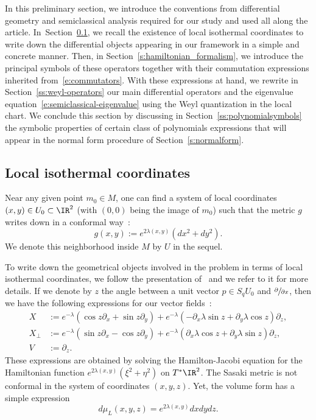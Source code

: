 \documentclass[JEP,XML,SOM,Unicode, NoEqCountersInSection,published]{cedram}
\theoremstyle{plain}
\theoremstyle{definition}
\theoremstyle{remark}
\begin{document}
In this preliminary section, we introduce the conventions from differential geometry and semiclassical analysis required for our study and used all along the article. In~Sec\-tion~\ref{s:local_coordinates}, we recall the existence of local isothermal coordinates to write down the differential objects appearing in our framework in a simple and concrete manner. Then, in Section~\ref{s:hamiltonian_formalism}, we introduce the principal symbols of these operators together with their commutation expressions inherited from~\eqref{e:commutators}. With these expressions at hand, we rewrite in Section~\ref{ss:weyl-operators} our main differential operators and the eigenvalue equation~\eqref{e:semiclassical-eigenvalue} using the Weyl quantization in the local chart. We conclude this section by discussing in Section~\ref{ss:polynomialsymbols} the symbolic properties of certain class of polynomials expressions that will appear in the normal form procedure of Section~\ref{s:normalform}.

\subsection{Local isothermal coordinates}
\label{s:local_coordinates}

Near any given point $m_0\in M$, one can find a system of local coordinates $(x,y)\in U_0\subset \IR^2$ (with $(0,0)$ being the image of $m_0$) such that the metric $g$ writes down in a conformal way~\cite[Th.\,3.4.8]{PaternainSaloUhlmann22}:
\[
g(x,y):=e^{2\lambda(x,y)}(dx^2+dy^2).
\]
We denote this neighborhood inside $M$ by $U$ in the sequel.

To write down the geometrical objects involved in the problem in terms of local isothermal coordinates, we follow the presentation of~\cite[\S 3.5]{PaternainSaloUhlmann22} and we refer to it for more details. If we denote by $z$ the angle between a unit vector $p\in S_qU_0$ and $\sfrac{\partial}{\partial x}$, then we have the following expressions for our vector fields~\cite[Lem.\,3.5.6]{PaternainSaloUhlmann22}:
\begin{align*}
X&:=e^{-\lambda}(\cos z\partial_x+\sin z\partial_y)+e^{-\lambda}\left(-\partial_x\lambda\sin z +\partial_y\lambda \cos z\right)\partial_z,
\\
X_\perp&:=e^{-\lambda}(\sin z\partial_x-\cos z\partial_y)+e^{-\lambda}\left(\partial_x\lambda \cos z+\partial_y\lambda \sin z\right) \partial_z,\\
\tag*{and}
V&:= \partial_z.
\end{align*}
These expressions are obtained by solving the Hamilton-Jacobi equation for the Hamiltonian function $e^{2\lambda(x,y)}(\xi^2+\eta^2)$ on $T^*\IR^2$. The Sasaki metric is not conformal in the system of coordinates $(x,y,z)$. Yet, the volume form has a simple expression
\begin{equation}%
d\mu_{L}(x,y,z)=e^{2\lambda(x,y)}dxdydz.
\end{equation}
\end{document}
